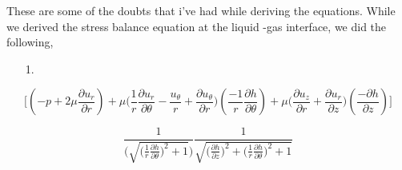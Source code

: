\documentclass{article}
\begin{document}
These are some of the doubts that i've had while deriving the equations.
While we derived the stress balance equation at the liquid -gas interface, we did the following,
\begin{itemize}
\item[1.]

\end{itemize}

\begin{equation}
\bigg[(-p + 2\mu \frac{\partial u_{r}}{\partial r}) + 
 \mu \bigg(\frac{1}{r}\frac{\partial u_{r}}{\partial \theta} -\frac{u_{\theta }}{r}+\frac{\partial u_{\theta }}{\partial r}\bigg)(\frac{-1}{r}\frac{\partial h}{\partial \theta}) + \mu \bigg(\frac{\partial u_{z}}{\partial r} + \frac{\partial u_{r}}{\partial z}\bigg)(\frac{-\partial h}{\partial z})\bigg]
 
\end{equation}

\begin{equation*}
\frac{1}{\bigg(\sqrt{\bigg(\frac{1}{r}\frac{\partial h}{\partial \theta}\bigg)^2 +  1}\bigg)}\frac{1}{\sqrt{\bigg(\frac{\partial h}{\partial z}\bigg)^2 + \bigg(\frac{1}{r}\frac{\partial h}{\partial \theta}\bigg)^2 + 1}}
\end{equation*}
\end{document}
